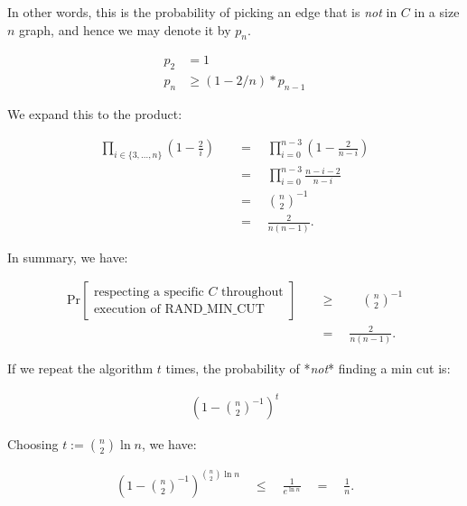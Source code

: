 In other words, this is the probability of picking an edge that is \emph{not} in
$C$ in a size $n$ graph, and hence we may denote it by $p_{n}$.

\begin{textred}
  \begin{align}
    p_2 &= 1\\
    p_{n} &\geq (1 - 2/n) * p_{n - 1}
  \end{align}
\end{textred}

We expand this to the product:

\begin{textred}
  \begin{align}
    \prod_{i \in \{3, \dots, n\}} \left(1 - \frac{2}{i}\right) \quad&=\quad \prod_{i =
    0}^{n - 3} \left(1 - \frac{2}{n - i}\right)\\
    &=\quad \prod_{i = 0}^{n - 3} \frac{n - i - 2}{n - i}\\
    \quad&=\quad \binom{n}{2}^{-1}\\
         &=\quad \frac{2}{n(n-1)}.
  \end{align}
\end{textred}

In summary, we have:

\begin{textred}
  \begin{align}
    \text{Pr}\left[
      \begin{array}{c}
        \text{respecting a specific } C \text{ throughout}\\
        \text{execution of RAND\_MIN\_CUT}
      \end{array}
      \right]\quad &\geq \quad \quad \binom{n}{2}^{-1}\\
                   &=\quad  \frac{2}{n(n-1)}.
  \end{align}
\end{textred}

If we repeat the algorithm $t$ times, the probability of *\emph{not}* finding a
min cut is:


\begin{textred}
  \begin{align}
    \left(1 - \binom{n}{2}^{-1}\right)^t
  \end{align}
\end{textred}

Choosing $t := \binom{n}{2}\ln n$, we have:

\begin{textred}
  \begin{align}
    \left(1 - \binom{n}{2}^{-1}\right)^{\binom{n}{2} \ln n} \quad\leq \quad\frac{1}{e^{\ln
    n}}\quad =\quad \frac{1}{n}.
  \end{align}
\end{textred}
